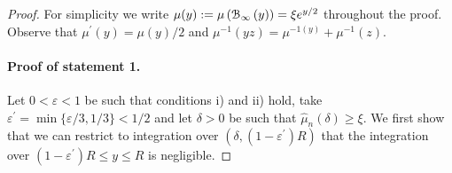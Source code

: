 \begin{proof} \hfill

For simplicity we write $\mu(y) := \mu\left({\mathcal B}_{\infty}\left(y\right)\right) = \xi e^{y/2}$ throughout the proof. Observe that $\mu^\prime(y) = \mu(y)/2$ and $\mu^{-1}(y z) = \mu^{-1(y)} + \mu^{-1}(z)$.



%
%
%




\paragraph{Proof of statement 1.}

Let $0 < \varepsilon < 1$ be such that conditions i) and ii) hold, take $\varepsilon^\prime = \min\{\varepsilon/3,1/3\} < 1/2$ and let $\delta > 0$ be such that $\hat{\mu}_n(\delta) \ge \xi$. We first show that we can restrict to integration over $(\delta, (1-\varepsilon^\prime)R)$ that the integration over $(1-\varepsilon^\prime)R \le y \le R$ is negligible.
 

\end{proof}
